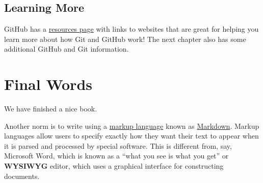 \documentclass[]{book}
\begin{document}
\section{Learning More}\label{learning-more}

GitHub has a
\href{https://help.github.com/articles/good-resources-for-learning-git-and-github/}{resources
page} with links to websites that are great for helping you learn more
about how Git and GitHub work! The next chapter also has some additional
GitHub and Git information.

\chapter{Final Words}\label{final-words}

We have finished a nice book.

Another norm is to write using a
\href{https://en.wikipedia.org/wiki/Markup_language}{markup language}
known as \href{https://daringfireball.net/projects/markdown/}{Markdown}.
Markup languages allow users to specify exactly how they want their text
to appear when it is parsed and processed by special software. This is
different from, say, Microsoft Word, which is known as a ``what you see
is what you get'' or \textbf{WYSIWYG} editor, which uses a graphical
interface for constructing documents.


\end{document}
